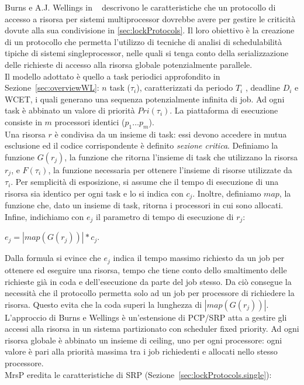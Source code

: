 Burns e A.J. Wellings in ~\cite{Burns:2013:SCM:2547348.2547350} descrivono le caratteristiche che un protocollo di accesso a risorsa per sistemi multiprocessor dovrebbe avere per gestire le criticità dovute alla sua condivisione in \ref{sec:lockProtocols}. Il loro obiettivo è la creazione di un protocollo che permetta l’utilizzo di tecniche di analisi di schedulabilità tipiche di sistemi singleprocessor, nelle quali si tenga conto della serializzazione delle richieste di accesso alla risorsa globale potenzialmente parallele.\\

Il modello adottato è quello a task periodici approfondito in Sezione~\ref{sec:overviewWL}: $n$ task ($\tau_i$), caratterizzati da periodo $T_i$ , deadline $D_i$ e WCET, i quali generano una sequenza potenzialmente infinita di job. Ad ogni task è abbinato un valore di priorità $Pri(\tau_i)$. La piattaforma di esecuzione consiste in $m$ processori identici ($p_1 … p_m$).\\
Una risorsa $r$ è condivisa da un insieme di task: essi devono accedere in mutua esclusione ed il codice corrispondente è definito \textit{sezione critica}. Definiamo la funzione $G(r_j)$, la funzione che ritorna l’insieme di task che utilizzano la risorsa $r_j$, e $F(\tau_i)$, la funzione necessaria per ottenere l’insieme di risorse utilizzate da $\tau_i$. Per semplicità di esposizione, si assume che il tempo di esecuzione di una risorsa sia identico per ogni task e lo si indica con $c_j$. Inoltre, definiamo $map$, la funzione che, dato un insieme di task, ritorna i processori in cui sono allocati.\\
Infine, indichiamo con $e_j$ il parametro di tempo di esecuzione di $r_j$:\\

\centerline{$e_j = | map(G(r_j)) | * c_j$.}

\vspace{4 mm}

Dalla formula si evince che $e_j$ indica il tempo massimo richiesto da un job per ottenere ed eseguire una risorsa, tempo che tiene conto dello smaltimento delle richieste già in coda e dell’esecuzione da parte del job stesso. Da ciò consegue la necessità che il protocollo permetta solo ad un job per processore di richiedere la risorsa. Questo evita che la coda superi la lunghezza di $| map(G(r_j)) |$.\\

L’approccio di Burns e Wellings è un’estensione di PCP/SRP atta a gestire gli accessi alla risorsa in un sistema partizionato con scheduler fixed priority. Ad ogni risorsa globale è abbinato un insieme di ceiling, uno per ogni processore: ogni valore è pari alla priorità massima tra i job richiedenti e allocati nello stesso processore.\\
MrsP eredita le caratteristiche di SRP (Sezione~\ref{sec:lockProtocols.single}):

